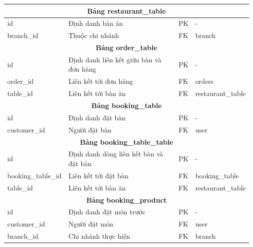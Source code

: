\begin{longtable}{|l|p{6cm}|l|l|}
	\multicolumn{4}{|c|}{\textbf{Bảng restaurant\_table}}                                                                   \\
	\hline
	id                      & Định danh bàn ăn                               & PK                 & -                       \\
	branch\_id              & Thuộc chi nhánh                                & FK                 & branch                  \\
	\hline

	\multicolumn{4}{|c|}{\textbf{Bảng order\_table}}                                                                        \\
	\hline
	id                      & Định danh liên kết giữa bàn và đơn hàng        & PK                 & -                       \\
	order\_id               & Liên kết tới đơn hàng                          & FK                 & orders                  \\
	table\_id               & Liên kết tới bàn ăn                            & FK                 & restaurant\_table       \\
	\hline

	\multicolumn{4}{|c|}{\textbf{Bảng booking\_table}}                                                                      \\
	\hline
	id                      & Định danh đặt bàn                              & PK                 & -                       \\
	customer\_id            & Người đặt bàn                                  & FK                 & user                    \\
	\hline

	\multicolumn{4}{|c|}{\textbf{Bảng booking\_table\_table}}                                                               \\
	\hline
	id                      & Định danh dòng liên kết bàn và đặt bàn         & PK                 & -                       \\
	booking\_table\_id      & Liên kết tới đặt bàn                           & FK                 & booking\_table          \\
	table\_id               & Liên kết tới bàn ăn                            & FK                 & restaurant\_table       \\
	\hline

	\multicolumn{4}{|c|}{\textbf{Bảng booking\_product}}                                                                    \\
	\hline
	id                      & Định danh đặt món trước                        & PK                 & -                       \\
	customer\_id            & Người đặt món                                  & FK                 & user                    \\
	branch\_id              & Chi nhánh thực hiện                            & FK                 & branch                  \\
	\hline


\end{longtable}

